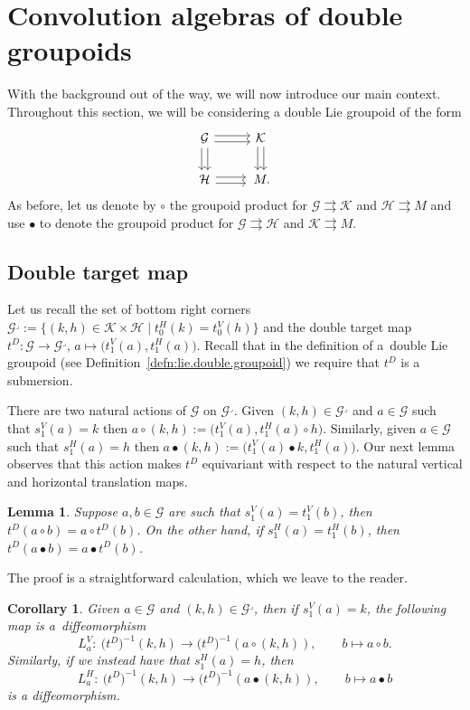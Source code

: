 \documentclass[pdftex]{sigma}
\numberwithin{equation}{section}
\newtheorem{Corollary}[Theorem]{Corollary}
\newtheorem{Lemma}[Theorem]{Lemma}
\theoremstyle{definition}
\newcommand{\CG}{\mathcal{G}}
\newcommand{\CH}{\mathcal{H}}
\newcommand{\CK}{\mathcal{K}}
\newcommand{\inv}{^{-1}}
\newcommand{\darrow}{\arrow[d, shift right] \arrow[d, shift left]}
\newcommand{\rarrow}{\arrow[r, shift right] \arrow[r, shift left]}
\newcommand{\grpd}{\rightrightarrows}
\begin{document}
\section{Convolution algebras of double groupoids}\label{sec5}
With the background out of the way, we will now introduce our main context. Throughout this section, we will be considering a double Lie groupoid of the form
 \begin{equation*}\label{eqn:haar.system.double.groupoid}
  \begin{tikzcd}
\CG \darrow \rarrow & \CK \darrow \\
\CH \rarrow &\, M.
\end{tikzcd}
\end{equation*}
As before, let us denote by $ \circ $ the groupoid product for $ \CG \grpd \CK $ and $ \CH \grpd M $ and use $ \bullet $ to denote the groupoid product for $ \CG \grpd \CH $ and $ \CK \grpd M $.
\subsection{Double target map}
Let us recall the set of bottom right corners
$\CG^\lrcorner := \big\{ (k,h) \in \CK \times \CH \mid t^H_0(k) = t^V_0(h) \big\}$
and the double target map
$t^D \colon \CG \to \CG^\lrcorner$, $a \mapsto \big(t_1^V(a), t_1^H(a)\big)$.
Recall that in the definition of a~double Lie groupoid (see Definition~\ref{defn:lie.double.groupoid}) we require that $ t^D $ is a submersion.

There are two natural actions of $ \CG $ on $ \CG^\lrcorner$. Given $ (k,h) \in \CG^\lrcorner $ and $ a \in \CG $ such that $ s^V_1(a) = k $ then
$a \circ (k,h) := \big( t^V_1(a), t^H_1(a) \circ h\big)$.
Similarly, given $ a \in \CG $ such that $ s^H_1(a) = h $ then
$a \bullet (k,h) := \big( t^V_1(a) \bullet k, t^H_1(a)\big)$.
Our next lemma observes that this action makes $ t^D $ equivariant with respect to the natural vertical and horizontal translation maps.

\begin{Lemma}
  Suppose $ a, b \in \CG $ are such that $ s^V_1(a) = t^V_1(b) $, then
  $t^D(a \circ b) = a \circ t^D(b) $.
  On the other hand, if $ s^H_1(a) = t^H_1(b)$, then
  $t^D(a \bullet b) = a \bullet t^D(b)$.
\end{Lemma}
The proof is a straightforward calculation, which we leave to the reader.
\begin{Corollary}
  Given $ a \in \CG $ and $ (k,h) \in \CG^\lrcorner $, then if $ s^V_1(a) = k $, the following map is a~diffeomorphism
  \[ L^V_a \colon \ \big(t^D\big)\inv(k,h) \to \big(t^D\big)\inv( a \circ (k,h)), \qquad b \mapsto a \circ b. \]
  Similarly, if we instead have that $ s^H_1(a) = h $, then
  \[ L^H_a \colon \ \big(t^D\big)\inv(k,h) \to \big(t^D\big)\inv( a \bullet (k,h)), \qquad b \mapsto a \bullet b \]
  is a diffeomorphism.
\end{Corollary}
\end{document}
